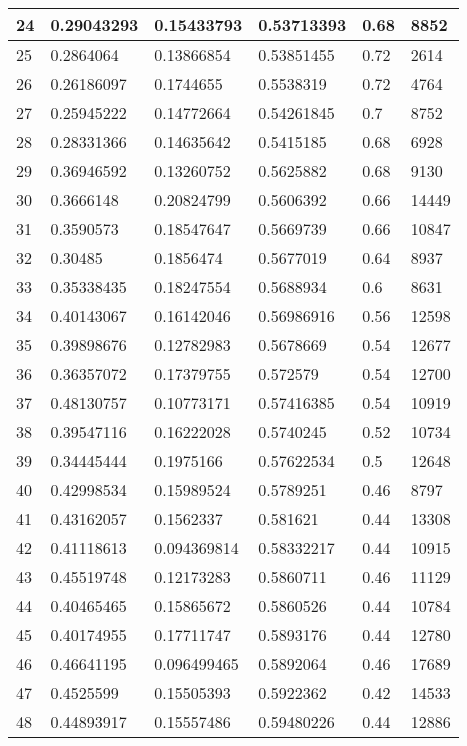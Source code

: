 \begin{longtable}{|l|l|l|l|l|l|}
24 & 0.29043293 & 0.15433793 & 0.53713393 & 0.68 & 8852 \\ \hline 
25 & 0.2864064 & 0.13866854 & 0.53851455 & 0.72 & 2614 \\ \hline 
26 & 0.26186097 & 0.1744655 & 0.5538319 & 0.72 & 4764 \\ \hline 
27 & 0.25945222 & 0.14772664 & 0.54261845 & 0.7 & 8752 \\ \hline 
28 & 0.28331366 & 0.14635642 & 0.5415185 & 0.68 & 6928 \\ \hline 
29 & 0.36946592 & 0.13260752 & 0.5625882 & 0.68 & 9130 \\ \hline 
30 & 0.3666148 & 0.20824799 & 0.5606392 & 0.66 & 14449 \\ \hline 
31 & 0.3590573 & 0.18547647 & 0.5669739 & 0.66 & 10847 \\ \hline 
32 & 0.30485 & 0.1856474 & 0.5677019 & 0.64 & 8937 \\ \hline 
33 & 0.35338435 & 0.18247554 & 0.5688934 & 0.6 & 8631 \\ \hline 
34 & 0.40143067 & 0.16142046 & 0.56986916 & 0.56 & 12598 \\ \hline 
35 & 0.39898676 & 0.12782983 & 0.5678669 & 0.54 & 12677 \\ \hline 
36 & 0.36357072 & 0.17379755 & 0.572579 & 0.54 & 12700 \\ \hline 
37 & 0.48130757 & 0.10773171 & 0.57416385 & 0.54 & 10919 \\ \hline 
38 & 0.39547116 & 0.16222028 & 0.5740245 & 0.52 & 10734 \\ \hline 
39 & 0.34445444 & 0.1975166 & 0.57622534 & 0.5 & 12648 \\ \hline 
40 & 0.42998534 & 0.15989524 & 0.5789251 & 0.46 & 8797 \\ \hline 
41 & 0.43162057 & 0.1562337 & 0.581621 & 0.44 & 13308 \\ \hline 
42 & 0.41118613 & 0.094369814 & 0.58332217 & 0.44 & 10915 \\ \hline 
43 & 0.45519748 & 0.12173283 & 0.5860711 & 0.46 & 11129 \\ \hline 
44 & 0.40465465 & 0.15865672 & 0.5860526 & 0.44 & 10784 \\ \hline 
45 & 0.40174955 & 0.17711747 & 0.5893176 & 0.44 & 12780 \\ \hline 
46 & 0.46641195 & 0.096499465 & 0.5892064 & 0.46 & 17689 \\ \hline 
47 & 0.4525599 & 0.15505393 & 0.5922362 & 0.42 & 14533 \\ \hline 
48 & 0.44893917 & 0.15557486 & 0.59480226 & 0.44 & 12886 \\ \hline 

\end{longtable}
